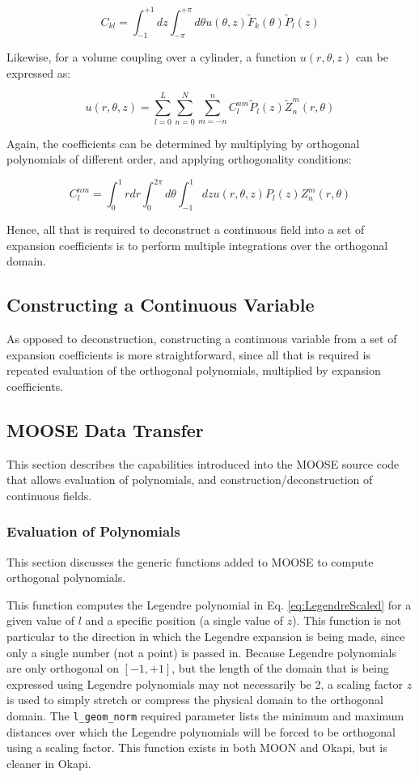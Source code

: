 \documentclass[10pt]{article}
\newcommand{\beq}{\begin{equation}}
\newcommand{\eeq}{\end{equation}}
\newcounter{subsubsubsection}[subsubsection]
\numberwithin{equation}{section} %
\begin{document}
\beq
\label{eq:ScaledExpansionCoeff}
C_{kl}=\int_{-1}^{+1}dz\int_{-\pi}^{+\pi}d\theta u(\theta, z)\tilde{F}_k(\theta)\tilde{P}_l(z)
\eeq

Likewise, for a volume coupling over a cylinder, a function \(u(r,\theta,z)\) can be expressed as:

\beq
\label{eq:ZLReconstruction}
u(r,\theta,z)=\sum_{l=0}^{L}\sum_{n=0}^N\sum_{m=-n}^{n}C_{l}^{nm}\tilde{P}_l(z)\tilde{Z}_n^m(r,\theta)
\eeq

Again, the coefficients can be determined by multiplying by orthogonal polynomials of different order, and applying orthogonality conditions:

\beq
C_l^{nm}=\int_0^1rdr\int_{0}^{2\pi}d\theta\int_{-1}^{1}dzu(r,\theta,z)P_l(z)Z_n^m(r,\theta)
\eeq

Hence, all that is required to deconstruct a continuous field into a set of expansion coefficients is to perform multiple integrations over the orthogonal domain.

\subsection{Constructing a Continuous Variable}

As opposed to deconstruction, constructing a continuous variable from a set of expansion coefficients is more straightforward, since all that is required is repeated evaluation of the orthogonal polynomials, multiplied by expansion coefficients.

\subsection{MOOSE Data Transfer}
This section describes the capabilities introduced into the MOOSE source code that allows evaluation of polynomials, and construction/deconstruction of continuous fields. 

\subsubsection{Evaluation of Polynomials}
This section discusses the generic functions added to MOOSE to compute orthogonal polynomials.

This function computes the Legendre polynomial in Eq. \eqref{eq:LegendreScaled} for a given value of \(l\) and a specific position (a single value of \(z\)). This function is not particular to the direction in which the Legendre expansion is being made, since only a single number (not a point) is passed in. Because Legendre polynomials are only orthogonal on \([-1, +1]\), but the length of the domain that is being expressed using Legendre polynomials may not necessarily be 2, a scaling factor \(z\) is used to simply stretch or compress the physical domain to the orthogonal domain. The {\tt l\_geom\_norm} required parameter lists the minimum and maximum distances over which the Legendre polynomials will be forced to be orthogonal using a scaling factor. This function exists in both MOON and Okapi, but is cleaner in Okapi.
\end{document}
